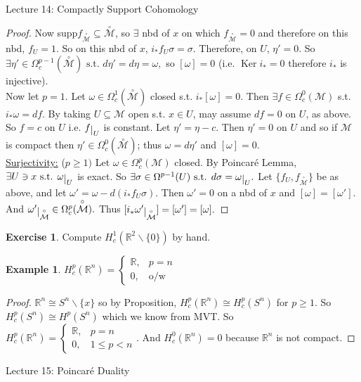 \documentclass[10pt]{article}
\theoremstyle{plain}
\theoremstyle{definition}
\newtheorem{exmp}[thm]{Example} %
\newtheorem{exercise}[thm]{Exercise}
\newcommand{\st}{\text{ s.t. }}
\newcommand{\Real}{\mathbb{R}}
\newcommand{\man}{\mathcal{M}}
\newcommand{\compactpformman}[1]{\Omega^{#1}_c(\man)}
\newcommand{\deriv}{d}
\newcommand{\df}{df}
\newcommand{\deta}{\deriv\eta}
\def\restrict#1{\raise-.5ex\hbox{\ensuremath|}_{#1}}
\DeclareMathOperator{\Ker}{Ker}
\newcommand{\puncman}{\overset{\circ}{\man}}
\begin{document}
\begin{section}{Lecture 14: Compactly Support Cohomology}
\begin{proof}
Now supp$f_{\puncman}\subseteq \puncman$, so $\exists$ nbd of $x$ on which $f_{\puncman} = 0$ and therefore on this nbd, $f_U = 1.$ So on this nbd of $x$, $i_*f_U \sigma = \sigma$. Therefore, on $U$, $\eta' = 0.$ So $\exists \eta' \in \Omega_c ^{p-1} (\puncman) \st \deta ' = \deta = \omega,$ so $[\omega] = 0$ (i.e. $\Ker i_* = 0$ therefore $i_*$ is injective).\\
Now let $p = 1.$ Let $\omega \in \Omega_c^1(\puncman) $ closed s.t. $i_* [ \omega ] = 0.$ Then $\exists f \in \Omega_c^0(\man)$ s.t. $i_*\omega = \df$. By taking $U \subseteq \man $ open s.t. $x\in U$, may assume $\df = 0$ on $U$, as above. So $f = c$ on $U$ i.e. $f\restrict{U}$ is constant. Let $\eta' = \eta -c$. Then $\eta' = 0$ on $U$ and so if $\man$ is compact then $\eta' \in \Omega_c^0(\puncman)$; thus $\omega = \deta' $ and $[\omega] = 0$.\\
\underline{Surjectivity:} ($p\geq 1)$ Let $\omega \in \compactpformman{p}$ closed. By Poincar\'e Lemma, $\exists U \ni x \st \omega \restrict{U} $ is exact. So $\exists \sigma \in \Omega^{p-1}(U) \st \deriv \sigma = \omega \restrict{U}.$ Let $\{f_U, f_{\puncman}\}$ be as above, and let $\omega' = \omega - \deriv(i_* f_U \sigma)$. Then $\omega ' = 0 $ on a nbd of $x$ and $[\omega ] = [\omega ' ].$ And $\omega ' \restrict{\puncman} \in \Omega_c^p(\puncman).$ Thus $[i_*\omega' \restrict{\puncman}] = [\omega'] = [\omega].$
\end{proof}
\begin{exercise}
Compute $H^1_c(\Real^2 \backslash \{0\})$ by hand.
\end{exercise}
\begin{exmp}
$H_c^p(\Real^n) = \begin{cases} \Real, & p = n \\ 0 ,& \text{o/w} \end{cases}$
\end{exmp}
\begin{proof}
$\Real^n \cong S^n \backslash \{x\}$ so by Proposition, $H^p_c(\Real^n) \cong H^p_c(S^n)$ for $p\geq 1$. So $H^p_c(S^n) \cong H^p(S^n)$ which we know from MVT. So $H^p_c(\Real^n) = \begin{cases} \Real, & p = n \\ 0 ,& 1\leq p < n \end{cases}$. And $H^0_c(\Real^n) = 0$ because $\Real^n$ is not compact.
\end{proof}




\end{section}
\begin{section}{Lecture 15: Poincar\'e Duality}





\end{section}
\end{document}
